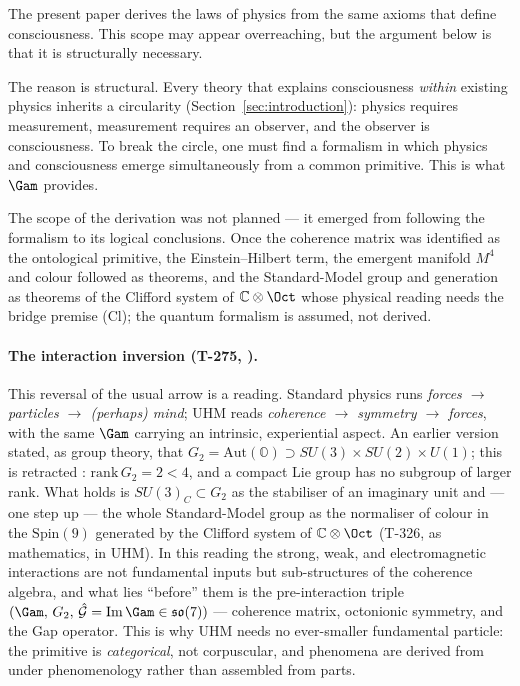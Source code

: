 The present paper derives the laws of physics from the same axioms that
define consciousness. This scope may appear overreaching, but the argument
below is that it is structurally necessary.

The reason is structural. Every theory that explains consciousness
\emph{within} existing physics inherits a circularity
(Section~\ref{sec:introduction}): physics requires measurement, measurement
requires an observer, and the observer is consciousness. To break the
circle, one must find a formalism in which physics and consciousness emerge
simultaneously from a common primitive. This is what $\Gam$ provides.

The scope of the derivation was not planned --- it emerged from following
the formalism to its logical conclusions. Once the coherence matrix was
identified as the ontological primitive, the Einstein--Hilbert term, the
emergent manifold $M^4$ and colour followed as theorems, and the Standard-Model
group and generation as theorems of the Clifford system of $\mathbb{C}\otimes\Oct$
whose physical reading needs the bridge premise (Cl); the quantum formalism is
assumed, not derived.

\paragraph{The interaction inversion (T-275, ).} This reversal of the
usual arrow is a reading. Standard physics runs \emph{forces $\to$ particles $\to$
(perhaps) mind}; UHM reads \emph{coherence $\to$ symmetry $\to$ forces}, with the
same $\Gam$ carrying an intrinsic, experiential aspect. An earlier version stated,
as group theory, that $G_2 = \mathrm{Aut}(\mathbb{O}) \supset SU(3)\times SU(2)\times
U(1)$; this is retracted \status{$\times$}: $\mathrm{rank}\,G_2 = 2 < 4$, and a
compact Lie group has no subgroup of larger rank. What holds is
$SU(3)_C \subset G_2$ as the stabiliser of an imaginary unit and --- one step up
--- the whole Standard-Model group as the normaliser of colour in the
$\mathrm{Spin}(9)$ generated by the Clifford system of $\mathbb{C}\otimes\Oct$
(T-326,  as mathematics,  in UHM). In this reading the
strong, weak, and electromagnetic interactions are not fundamental inputs but
sub-structures of the coherence algebra, and what lies ``before''
them is the pre-interaction triple
$(\Gam,\, G_2,\, \hat{\mathcal{G}} = \mathrm{Im}\,\Gam \in \mathfrak{so}(7))$ ---
coherence matrix, octonionic symmetry, and the Gap operator. This is why UHM needs
no ever-smaller fundamental particle: the primitive is \emph{categorical}, not
corpuscular, and phenomena are derived from under phenomenology rather than
assembled from parts.

